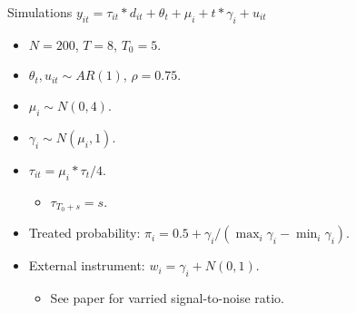\documentclass{beamer}
\newcommand{\1}{\mathds{1}} %
\begin{document}




\begin{frame}{Simulations}
    $y_{it} = \tau_{it}*d_{it} + \theta_t + \mu_i + t* \gamma_i +u_{it}$
\begin{itemize}
    \item $N = 200$, $T = 8$, $T_0 = 5$.
    \item $\theta_t, u_{it} \sim AR(1)$, $\rho = 0.75$.
    \item $\mu_i \sim N(0,4)$.
    \item $\gamma_i \sim N(\mu_i, 1)$.
    \item $\tau_{it} = \mu_i * \tau_t / 4$.
    \begin{itemize}
        \item $\tau_{T_0 + s} = s$. 
    \end{itemize}
    \item Treated probability: $\pi_i = 0.5 + \gamma_i / ( \max_i \gamma_i - \min_i \gamma_i )$.
    \item External instrument: $w_i = \gamma_i + N(0,1)$.
    \begin{itemize}
        \item See paper for varried signal-to-noise ratio.
    \end{itemize}
\end{itemize}
\end{frame}
\end{document}

